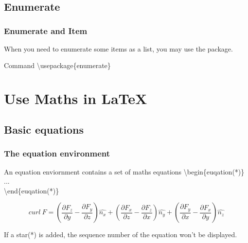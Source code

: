 \documentclass{beamer}
\newenvironment{command}{\begin{block}{Command}}{\end{block}}
\begin{document}
\subsection{Enumerate}
\begin{frame}
	\frametitle{Enumerate and Item}
	When you need to enumerate some items as a list, you may use the  package.
	\begin{command}
		\alert{\textbackslash usepackage}\{enumerate\}
	\end{command}
\end{frame}

\section{Use Maths in \LaTeX}
\begin{frame}
\end{frame}

\subsection{Basic equations}

\begin{frame}
	\frametitle{The equation environment}
	\begin{definition}
		An {\color{blue}equation} enviornment contains a set of maths equations
		{\color{red}\textbackslash begin\{euqation(*)\}}\\
		\quad ...\\
		{\color{red}\textbackslash end\{euqation(*)\}}\\
	\end{definition}
	\begin{example}
		\begin{equation}
		curl\ F=\left(\frac{\partial F_z}{\partial y}-\frac{\partial F_y}{\partial z}\right)\hat{n_x}+\left(\frac{\partial F_x}{\partial z}-\frac{\partial F_z}{\partial x}\right)\hat{n_y}+\left(\frac{\partial F_y}{\partial x}-\frac{\partial F_x}{\partial y}\right)\hat{n_z}
		\end{equation}
	\end{example}
	If a star({\color{blue}*}) is added, the sequence number of the equation won't be displayed.
\end{frame}
\end{document}
